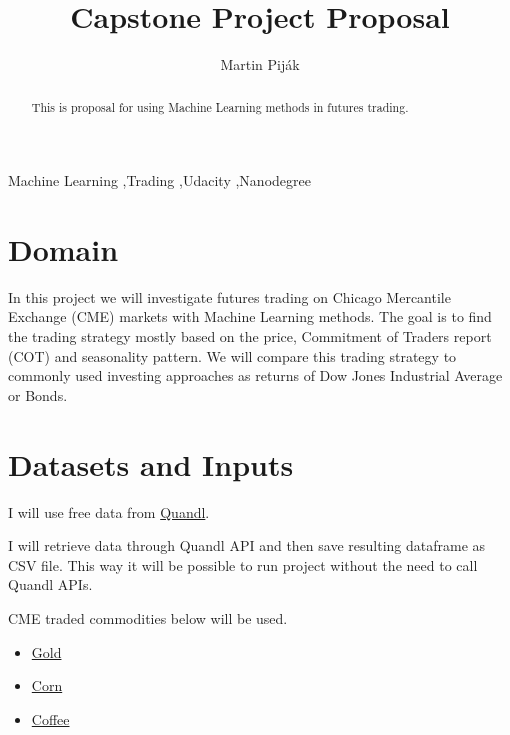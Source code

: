 \documentclass[final,2p]{elsarticle}
\begin{document}
\begin{frontmatter}

\title{Capstone Project Proposal}

\author{Martin Pij{\'a}k}

\address{Bratislava, Slovakia}

\begin{abstract}
This is proposal for using Machine Learning methods in futures trading.
\end{abstract}

\begin{keyword}
Machine Learning \sep{Trading} \sep{Udacity} \sep{Nanodegree}

\end{keyword}

\end{frontmatter}


\section{Domain}

In this project we will investigate futures trading on Chicago Mercantile Exchange (CME) markets with Machine Learning methods. The goal is to find the trading strategy mostly based on the price, Commitment of Traders report (COT) and seasonality pattern. We will compare this trading strategy to commonly used investing approaches as returns of Dow Jones Industrial Average or Bonds.

\section{Datasets and Inputs}

I will use free data from \href{https://www.quandl.com/}{Quandl}. 

I will retrieve data through Quandl API and then save resulting dataframe as CSV file.
This way it will be possible to run project without the need to call Quandl APIs.

CME traded commodities below will be used.

\begin{itemize}
\item \href{https://www.cmegroup.com/trading/metals/precious/gold.html}{Gold}
\item \href{https://www.cmegroup.com/trading/agricultural/grain-and-oilseed/corn.html}{Corn}
\item \href{https://www.cmegroup.com/trading/agricultural/softs/coffee.html}{Coffee}
\end{itemize}
\end{document}
